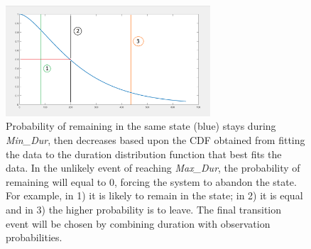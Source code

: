 \documentclass[conference]{IEEEtran}
\begin{document}
\begin{figure}[!t]
	\centering
	\includegraphics[width=3in]{cdf.png}
	
	\caption{Probability of remaining in the same state (blue) stays during \textit{Min\_Dur}, then decreases based upon the CDF obtained from fitting the data to the duration distribution function that best fits the data. In the unlikely event of reaching \textit{Max\_Dur}, the probability of remaining will equal to 0, forcing the system to abandon the state. For example, in 1) it is likely to remain in the state; in 2) it is equal and in 3) the higher probability is to leave. The final transition event will be chosen by combining duration with observation probabilities.}
	\label{fig2}
\end{figure}

%
\end{document}
